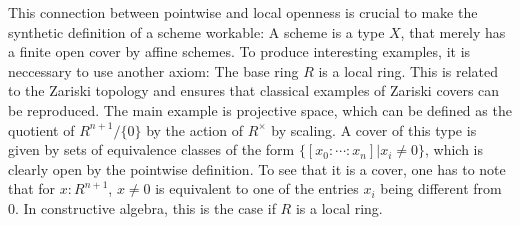 \documentclass{../util/zariski}
\begin{document}
This connection between pointwise and local openness is crucial to make the synthetic definition of a scheme workable:
A scheme is a type $X$, that merely has a finite open cover by affine schemes.
To produce interesting examples, it is neccessary to use another axiom: The base ring $R$ is a local ring.
This is related to the Zariski topology and ensures that classical examples of Zariski covers can be reproduced.
The main example is projective space, which can be defined as the quotient of $R^{n+1}/\{0\}$ by the action of $R^\times$ by scaling.
A cover of this type is given by sets of equivalence classes of the form $\{[x_0:\cdots:x_n] \vert x_i\neq 0 \}$, which is clearly open by the pointwise definition.
To see that it is a cover, one has to note that for $x:R^{n+1}$, $x\neq 0$ is equivalent to one of the entries $x_i$ being different from 0. In constructive algebra, this is the case if $R$ is a local ring.

\printbibliography
\end{document}

